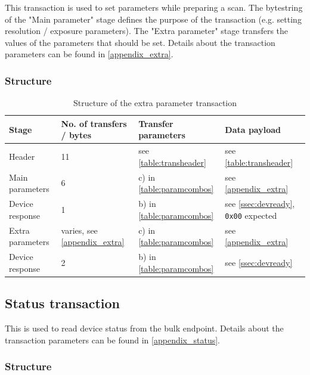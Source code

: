 \documentclass{article}
\begin{document}
This transaction is used to set parameters while preparing a scan.
The bytestring of the "Main parameter" stage defines the purpose of the transaction
(e.g. setting resolution / exposure parameters). The "Extra parameter" stage
transfers the values of the parameters that should be set.
Details about the transaction parameters can be found in \autoref{appendix_extra}.

\subsubsection{Structure}

\begin{table}[H]
  \caption{Structure of the extra parameter transaction}
  \centering
  \begin{tabular}{p{3cm} | p{1.5cm} | p{3cm} | p{3cm}}
    Stage & No. of transfers / bytes & Transfer parameters & Data payload \\ \hline
    
    Header & 11 & see \autoref{table:transheader} & see \autoref{table:transheader} \\
    Main parameters & 6 & c) in \autoref{table:paramcombos} & see \autoref{appendix_extra} \\
    Device response & 1 & b) in \autoref{table:paramcombos} & see \autoref{ssec:devready}, {\tt 0x00} expected \\
    Extra parameters & varies, see \autoref{appendix_extra} & c) in \autoref{table:paramcombos} & see \autoref{appendix_extra} \\
    Device response & 2 & b) in \autoref{table:paramcombos} & see \autoref{ssec:devready} \\
  \end{tabular}
\end{table}

\subsection{Status transaction}
\label{ssec:read_trans}

This is used to read device status from the bulk endpoint.
Details about the transaction parameters can be found in \autoref{appendix_status}.

\subsubsection{Structure}
\end{document}
